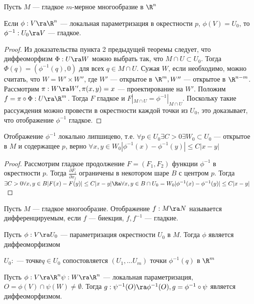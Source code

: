 Пусть \(M\) --- гладкое \(m\)-мерное многообразие в \(\R^n\)
\begin{lemma}
    Если \(\phi: V \ra \R^n\) --- локальная параметризация в окрестности \(p\), \(\phi(V) = U_0\), то \(\phi^{-1}: U_0 \ra V\) --- гладкое.
\end{lemma}
\begin{proof}
    Из доказательства пункта 2 предыдущей теоремы следует, что диффеоморфизм \(\Phi: U \ra W\) можно выбрать так, что \(M \cap U \subset U_0\). Тогда \(\Phi(q) = (\phi^{-1}(q), 0)\) для всех \(q \in M \cap U\). Сужая \(W\), если необходимо, можно считать, что \(W = W' \times W''\), где \(W'\) --- открытое в \(\R^m, W''\) --- открытое в \(\R^{n - m}\). Рассмотрим \(\pi: W \ra W', \pi(x, y) = x\) --- проектирование на \(W'\). Положим \(f = \pi \circ \Phi: U \ra \R^m\). Тогда \(F\) гладкое и \(F|_{M \cap U} = \phi^{-1}|_{M \cap U}\). Поскольку такие рассуждения можно провести в окрестности каждой точки из \(U_0\), это доказывает, что отображение \(\phi^{-1}\) гладкое.
\end{proof}

\begin{corollary}
    Отображение \(\phi^{-1}\) локально липшицево, т.е. \(\forall p \in U_0 \exists C > 0 \exists W_0 \subset U_0\) --- открытое в \(M\) и содержащее \(p\), верно \(\forall x, y \in W_0 |\phi^{-1}(x) - \phi^{-1}(y)| \le C|x - y|\)
\end{corollary}
\begin{proof}
    Рассмотрим гладкое продолжение \(F = (F_1, F_2)\) функции \(\phi^{-1}\) в окрестности \(p\). Тогда \(\frac{\partial F_i}{\partial x_j}\) ограничены в некотором шаре \(B\) с центром \(p\). Тогда \(\exists C > 0 \forall x, y \in B |F(x) - F(y)| \le C|x - y| \Ra \forall x, y \in B \cap U_0 = W_0 |\phi^{-1}(x) - \phi^{-1}(y)| \le C|x - y|\)
\end{proof}

\begin{definition}
    Пусть \(M\) --- гладкое многообразие. Отображение \(f: M \ra N\) называется дифференцируемым, если \(f\) --- биекция, \(f, f^{-1}\) --- гладкие.
\end{definition}

\begin{corollary}
    Пусть \(\phi: V \ra U_0\) --- параметризация окрестности \(U_0\) в \(M\). Тогда \(\phi\) является диффеоморфизмом
\end{corollary}

\begin{note}
    \(U_0:\) --- точке\(q \in U_0\) сопостовляется \((U_1, \dots U_m)\) точки \(\phi^{-1}(q)\) в \(\R^m\)
\end{note}

\begin{corollary}
    Пусть \(\phi: V \ra \R^n \psi: W \ra \R^n\) --- локальная параметризация, \(O = \phi(V) \cap \psi(W) \ne \emptyset\). Тогда \(g: \psi^{-1}(O) \ra \phi^{-1}(O), g = \phi^{-1}\circ\psi\) является диффеоморфизмом.
\end{corollary}
